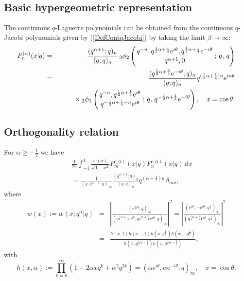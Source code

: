 \documentclass[envcountchap,graybox]{svmono}
\newcounter{rom}
\newcommand{\qhyp}[5]{\mbox{}_{#1}{\phi}_{#2}
\left(\genfrac{}{}{0pt}{}{#3}{#4}\,;\,q,\,#5\right)}
\newcommand{\mathindent}{\hspace{7.5mm}}
\newcommand{\e}{\textrm{e}}
\newcommand{\qhyp}[5]{\,\mbox{}_{#1}\phi_{#2}\!\left(
  \genfrac{}{}{0pt}{}{#3}{#4};#5\right)}
\begin{document}
{{\subsection*{Basic hypergeometric representation} The continuous $q$-Laguerre 
polynomials can be obtained from the continuous $q$-Jacobi polynomials given 
by (\ref{DefContqJacobi}) by taking the limit $\beta\rightarrow\infty$:
\begin{eqnarray}
\label{DefContqLaguerre}
P_n^{(\alpha)}(x|q)&=&\frac{(q^{\alpha+1};q)_n}{(q;q)_n}\,\qhyp{3}{2}
{q^{-n},q^{\frac{1}{2}\alpha+\frac{1}{4}}\e^{i\theta},q^{\frac{1}{2}\alpha+\frac{1}{4}}\e^{-i\theta}}
{q^{\alpha+1},0}{q}\\
&=&\frac{(q^{\frac{1}{2}\alpha+\frac{3}{4}}\e^{-i\theta};q)_n}{(q;q)_n}
q^{(\frac{1}{2}\alpha+\frac{1}{4})n}\e^{in\theta}\nonumber\\
& &{}\mathindent{}\times\qhyp{2}{1}{q^{-n},q^{\frac{1}{2}\alpha+\frac{1}{4}}\e^{i\theta}}
{q^{-\frac{1}{2}\alpha+\frac{1}{4}-n}\e^{i\theta}}
{q^{-\frac{1}{2}\alpha+\frac{1}{4}}\e^{-i\theta}},\quad x=\cos\theta.\nonumber
\end{eqnarray}

\subsection*{Orthogonality relation}
For $\alpha\geq -\frac{1}{2}$ we have
\begin{eqnarray}
\label{OrtContqLaguerre}
& &\frac{1}{2\pi}\int_{-1}^1\frac{w(x)}{\sqrt{1-x^2}}P_m^{(\alpha)}(x|q)P_n^{(\alpha)}(x|q)\,dx\nonumber\\
& &{}=\frac{1}{(q,q^{\alpha+1};q)_{\infty}}\frac{(q^{\alpha+1};q)_n}{(q;q)_n}
q^{(\alpha+\frac{1}{2})n}\,\delta_{mn},
\end{eqnarray}
where
\begin{eqnarray*} w(x):=w(x;q^{\alpha}|q)&=&\left|\frac{(\e^{2i\theta};q)_{\infty}}
{(q^{\frac{1}{2}\alpha+\frac{1}{4}}\e^{i\theta},
q^{\frac{1}{2}\alpha+\frac{3}{4}}\e^{i\theta};q)_{\infty}}\right|^2
=\left|\frac{(\e^{i\theta},-\e^{i\theta};q^{\frac{1}{2}})_{\infty}}
{(q^{\frac{1}{2}\alpha+\frac{1}{4}}\e^{i\theta};q^{\frac{1}{2}})_{\infty}}\right|^2\\
&=&\frac{h(x,1)h(x,-1)h(x,q^{\frac{1}{2}})h(x,-q^{\frac{1}{2}})}
{h(x,q^{\frac{1}{2}\alpha+\frac{1}{4}})h(x,q^{\frac{1}{2}\alpha+\frac{3}{4}})},
\end{eqnarray*}
with
$$h(x,\alpha):=\prod_{k=0}^{\infty}\left(1-2\alpha xq^k+\alpha^2q^{2k}\right)
=\left(\alpha\e^{i\theta},\alpha\e^{-i\theta};q\right)_{\infty},\quad x=\cos\theta.$$

}}
\end{document}
